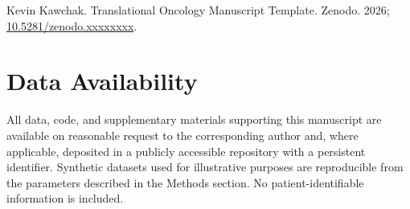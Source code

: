 Kevin Kawchak. Translational Oncology Manuscript Template. Zenodo. 2026;
\href{https://doi.org/10.5281/zenodo.xxxxxxxx}{10.5281/zenodo.xxxxxxxx}.

{}
\section*{Data Availability}
\label{sec:data}

All data, code, and supplementary materials supporting this manuscript are
available on reasonable request to the corresponding author and, where
applicable, deposited in a publicly accessible repository with a persistent
identifier. Synthetic datasets used for illustrative purposes are
reproducible from the parameters described in the Methods section. No
patient-identifiable information is included.
